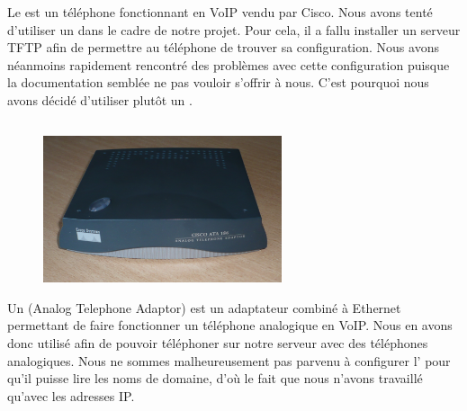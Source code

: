 Le {\cph} est un téléphone fonctionnant en VoIP vendu par Cisco. Nous avons tenté d'utiliser un {\cph} dans le cadre de notre projet. Pour cela, il a fallu installer un serveur TFTP afin de permettre au téléphone de trouver sa configuration.
Nous avons néanmoins rapidement rencontré des problèmes avec cette configuration puisque la documentation semblée ne pas vouloir s'offrir à nous.
C'est pourquoi nous avons décidé d'utiliser plutôt un {\ata}.

\newpage

\subsection{\cata}

\begin{figure}[h]
\begin{center}
\includegraphics[width=7cm]{images/ata.jpg}
\end{center}
\caption{\ata}
\end{figure}

Un {\ata} (Analog Telephone Adaptor) est un adaptateur combiné à Ethernet permettant de faire fonctionner un téléphone analogique en VoIP. Nous en avons donc utilisé afin de pouvoir téléphoner sur notre serveur avec des téléphones analogiques. Nous ne sommes malheureusement pas parvenu à configurer l'{\ata} pour qu'il puisse lire les noms de domaine, d'où le fait que nous n'avons travaillé qu'avec les adresses IP.
